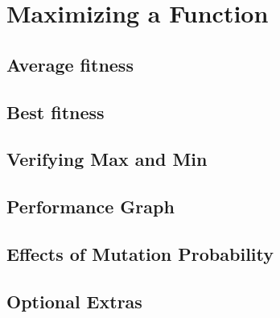 \section{Maximizing a Function}

\subsection{Average fitness}

\subsection{Best fitness}

\subsection{Verifying Max and Min}

\subsection{Performance Graph}

\subsection{Effects of Mutation Probability}

\subsection{Optional Extras}
